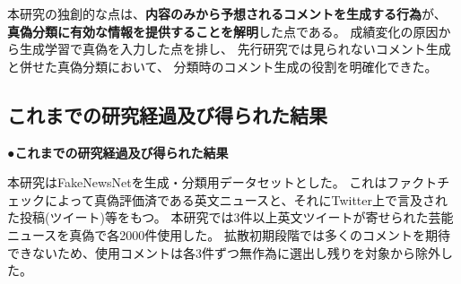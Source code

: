 {	本研究の独創的な点は、\textbf{内容のみから予想されるコメントを生成する行為}が、
	\textbf{真偽分類に有効な情報を提供することを解明}した点である。
	成績変化の原因から生成学習で真偽を入力した点を排し、
	先行研究では見られないコメント生成と併せた真偽分類において、
	分類時のコメント生成の役割を明確化できた。
	


	\subsection{これまでの研究経過及び得られた結果}
	\noindent
	●\textbf{これまでの研究経過及び得られた結果}

	本研究はFakeNewsNet\cite{Shu2018FakeNewsNetAD, shu2017fake}を生成・分類用データセットとした。
	これはファクトチェックによって真偽評価済である英文ニュースと、それにTwitter上で言及された投稿(ツイート)等をもつ。
	本研究では3件以上英文ツイートが寄せられた芸能ニュースを真偽で各2000件使用した。
	拡散初期段階では多くのコメントを期待できないため、使用コメントは各3件ずつ無作為に選出し残りを対象から除外した。

}
